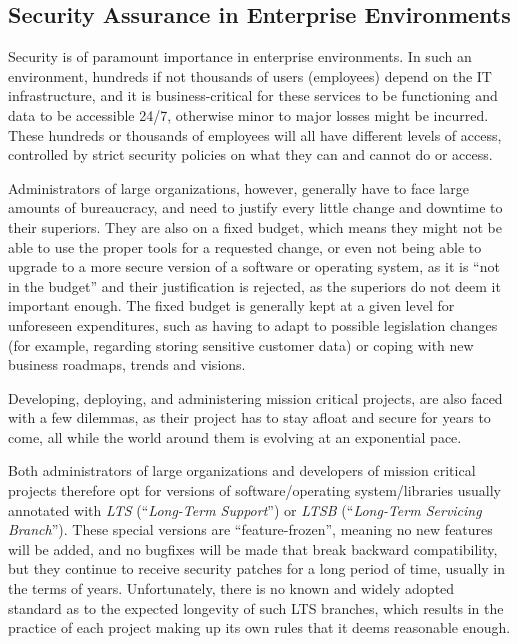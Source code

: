 \documentclass[a4paper,12pt]{article}
\begin{document}
\subsection{Security Assurance in Enterprise Environments} \label{secassentenv}
 

	Security is of paramount importance in enterprise environments. In such an environment, hundreds if not thousands of users (employees) depend on the IT infrastructure, and it is business-critical for these services to be functioning and data to be accessible 24/7, otherwise minor to major losses might be incurred. These hundreds or thousands of employees will all have different levels of access, controlled by strict security policies on what they can and cannot do or access.
	
	Administrators of large organizations, however, generally have to face large amounts of bureaucracy, and need to justify every little change and downtime to their superiors. They are also on a fixed budget, which means they might not be able to use the proper tools for a requested change, or even not being able to upgrade to a more secure version of a software or operating system, as it is ``not in the budget'' and their justification is rejected, as the superiors do not deem it important enough. The fixed budget is generally kept at a given level for unforeseen expenditures, such as having to adapt to possible legislation changes (for example, regarding storing sensitive customer data) or coping with new business roadmaps, trends and visions.\cite{gkreiz06}
	
	Developing, deploying, and administering mission critical projects, are also faced with a few dilemmas, as their project has to stay afloat and secure for years to come, all while the world around them is evolving at an exponential pace.
	
	Both administrators of large organizations and developers of mission critical projects therefore opt for versions of software/operating system/libraries usually annotated with \textit{LTS} (``\textit{Long-Term Support}'') or \textit{LTSB} (``\textit{Long-Term Servicing Branch}''). These special versions are ``feature-frozen'', meaning no new features will be added, and no bugfixes will be made that break backward compatibility, but they continue to receive security patches for a long period of time, usually in the terms of years. Unfortunately, there is no known and widely adopted standard as to the expected longevity of such LTS branches, which results in the practice of each project making up its own rules that it deems reasonable enough.
	
\end{document}
